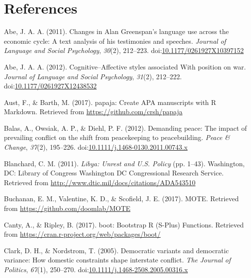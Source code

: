\documentclass[english,,man,floatsintext]{apa6}
\begin{document}
\newpage

\hypertarget{references}{%
\section{References}\label{references}}

\setlength{\parindent}{-0.5in}
\setlength{\leftskip}{0.5in}

\hypertarget{refs}{}
\leavevmode\hypertarget{ref-Abe2011}{}%
Abe, J. A. A. (2011). Changes in Alan Greenspan's language use across the economic cycle: A text analysis of his testimonies and speeches. \emph{Journal of Language and Social Psychology}, \emph{30}(2), 212--223. doi:\href{https://doi.org/10.1177/0261927X10397152}{10.1177/0261927X10397152}

\leavevmode\hypertarget{ref-Abe2012}{}%
Abe, J. A. A. (2012). Cognitive--Affective styles associated With position on war. \emph{Journal of Language and Social Psychology}, \emph{31}(2), 212--222. doi:\href{https://doi.org/10.1177/0261927X12438532}{10.1177/0261927X12438532}

\leavevmode\hypertarget{ref-Aust2017}{}%
Aust, F., \& Barth, M. (2017). papaja: Create APA manuscripts with R Markdown. Retrieved from \url{https://github.com/crsh/papaja}

\leavevmode\hypertarget{ref-Balas2012}{}%
Balas, A., Owsiak, A. P., \& Diehl, P. F. (2012). Demanding peace: The impact of prevailing conflict on the shift from peacekeeping to peacebuilding. \emph{Peace \& Change}, \emph{37}(2), 195--226. doi:\href{https://doi.org/10.1111/j.1468-0130.2011.00743.x}{10.1111/j.1468-0130.2011.00743.x}

\leavevmode\hypertarget{ref-Blanchard2011}{}%
Blanchard, C. M. (2011). \emph{Libya: Unrest and U.S. Policy} (pp. 1--43). Washington, DC: Library of Congress Washington DC Congressional Research Service. Retrieved from \url{http://www.dtic.mil/docs/citations/ADA543510}

\leavevmode\hypertarget{ref-Buchanan2017}{}%
Buchanan, E. M., Valentine, K. D., \& Scofield, J. E. (2017). MOTE. Retrieved from \url{https://github.com/doomlab/MOTE}

\leavevmode\hypertarget{ref-Canty2017}{}%
Canty, A., \& Ripley, B. (2017). boot: Bootstrap R (S-Plus) Functions. Retrieved from \url{https://cran.r-project.org/web/packages/boot/}

\leavevmode\hypertarget{ref-Clark2005}{}%
Clark, D. H., \& Nordstrom, T. (2005). Democratic variants and democratic variance: How domestic constraints shape interstate conflict. \emph{The Journal of Politics}, \emph{67}(1), 250--270. doi:\href{https://doi.org/10.1111/j.1468-2508.2005.00316.x}{10.1111/j.1468-2508.2005.00316.x}
\end{document}
